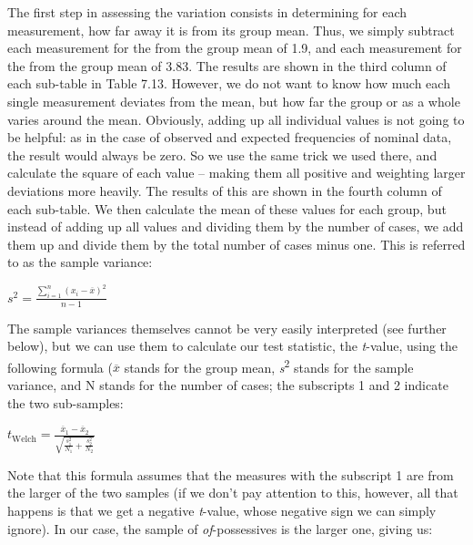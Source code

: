 The first step in assessing the variation  consists in determining for each measurement,  how far away it is from its group mean.  Thus, we simply subtract each measurement for the   from the group mean of 1.9, and each measurement for the  from the group mean of 3.83. The results are shown in the third column of each sub\hyp{}table in Table 7.13. However, we do not want to know how much each single measurement deviates from the mean, but how far the group  or  as a whole varies around the mean.  Obviously, adding up all individual values is not going to be helpful: as in the case of observed and expected  frequencies of nominal  data, the result would always be zero. So we use the same trick we used there, and calculate the square of each value -- making them all positive and weighting larger deviations more heavily. The results of this are shown in the fourth column of each sub\hyp{}table. We then calculate the mean  of these values for each group, but instead of adding up all values and dividing them by the number of cases, we add them up and divide them by the total number of cases minus one. This is referred to as the sample  variance:

\begin{exe}
\ex $\displaystyle{s^2=\frac{\sum _{i=1}^n(x_i-\overline{x})^2}{n-1}}$
\label{ex:formulasamplevariance}
\end{exe}

The sample variances  themselves cannot be very easily interpreted (see further below), but we can use them to calculate our test statistic, the \textit{t}-value, using the following formula ($\overline{x}$ stands for the group mean,  \textit{s}\textsuperscript{2} stands for the sample variance, and N stands for the number of cases; the subscripts 1 and 2 indicate the two sub\hyp{}samples:

\begin{exe}
\ex $\displaystyle{t_\text{Welch} = \frac{\overline{x}_1 - \overline{x}_2}{\sqrt{\frac{s_1^2}{N_1} + \frac{s_2^2}{N_2}}}}$
\label{ex:formulawelchst}
\end{exe}

Note that this formula assumes that the measures with the subscript 1 are from the larger of the two samples (if we don't pay attention to this, however, all that happens is that we get a negative \textit{t}-value, whose negative sign we can simply ignore). In our case, the sample of \textit{of}-possessives  is the larger one, giving us:

